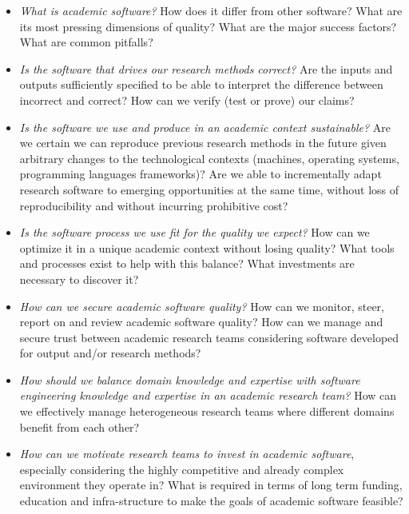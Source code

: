 \documentclass[a4paper,UKenglish]{dagman}
\begin{document}
\begin{itemize}
\item \emph{What is academic software?} How does it differ from other software? What are its most pressing dimensions of quality? What are the major success factors? What are common pitfalls?
\item \emph{Is the software that drives our research methods correct?} Are the inputs and outputs sufficiently specified to be able to interpret the difference between incorrect and correct? How can we verify (test or prove) our claims?
\item \emph{Is the software we use and produce in an academic context sustainable?}
Are we certain we can reproduce previous research methods in the future given arbitrary changes to the technological contexts (machines, operating systems, programming languages frameworks)? Are we able to incrementally adapt research software to emerging opportunities at the same time, without loss of reproducibility and without incurring prohibitive cost?
\item \emph{Is the software process we use fit for the quality we expect?} How can we optimize it in a unique academic context without losing quality? What tools and processes exist to help with this balance? What investments are necessary to discover it?
\item \emph{How can we secure academic software quality?} How can we monitor, steer, report on and review academic software quality? How can we manage and secure trust between academic research teams considering software developed for output and/or research methods?
\item \emph{How should we balance domain knowledge and expertise with software engineering knowledge and expertise in an academic research team?} How can we effectively manage heterogeneous research teams where different domains benefit from each other?
\item \emph{How can we motivate research teams to invest in academic software}, especially considering the highly competitive and already complex environment they operate in?
What is required in terms of long term funding, education and infra-structure to make the goals of academic software feasible?
\end{itemize}
\end{document}
